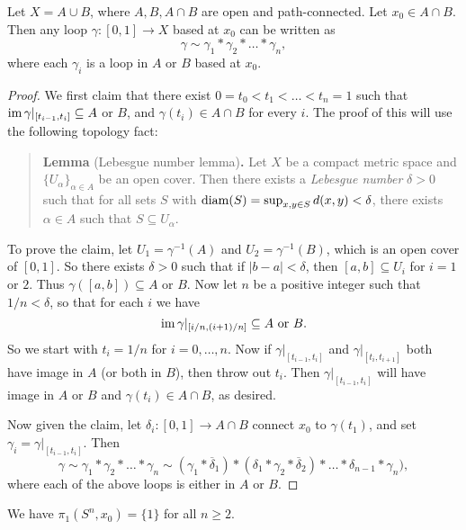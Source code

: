 \begin{lemma}
  Let $X = A \cup B$, where $A, B, A \cap B$
  are open and path-connected. Let $x_0 \in A \cap B$.
  Then any loop $\gamma : [0, 1] \to X$ based at
  $x_0$ can be written as
  \[
    \gamma \sim \gamma_1 * \gamma_2 * \dots * \gamma_n,
  \]
  where each $\gamma_i$ is a loop in $A$ or $B$
  based at $x_0$.
\end{lemma}

\begin{proof}
  We first claim that there exist
  $0 = t_0 < t_1 < \dots < t_n = 1$ such that
  $\operatorname{im} \gamma|_{[t_{i - 1}, t_i]} \subseteq A$
  or $B$, and $\gamma(t_i) \in A \cap B$ for every $i$.
  The proof of this will use the following
  topology fact:
  \begin{quote}
    \textbf{Lemma} (Lebesgue number lemma)\textbf{.}
    Let $X$ be a compact
    metric space and $\{U_\alpha\}_{\alpha \in A}$ be
    an open cover. Then there exists a \emph{Lebesgue number}
    $\delta > 0$ such that for all sets $S$ with
    $\operatorname{diam}(S) = \sup_{x, y \in S} d(x, y) < \delta$,
    there exists $\alpha \in A$ such that $S \subseteq U_\alpha$.
  \end{quote}
  To prove the claim, let $U_1 = \gamma^{-1}(A)$
  and $U_2 = \gamma^{-1}(B)$, which is an open
  cover of $[0, 1]$. So there exists $\delta > 0$
  such that if $|b - a| < \delta$, then
  $[a, b] \subseteq U_i$ for $i = 1$ or $2$. Thus
  $\gamma([a, b]) \subseteq A$ or $B$. Now let
  $n$ be a positive integer such that $1 / n < \delta$,
  so that for each $i$ we have
  \[\operatorname{im} \gamma|_{[i / n, (i + 1) / n]} \subseteq A \text{ or } B.\]
  So we start with $t_i = 1 / n$ for $i = 0, \dots, n$.
  Now if $\gamma|_{[t_{i - 1}, t_i]}$ and
  $\gamma|_{[t_i, t_{i + 1}]}$ both have image in
  $A$ (or both in $B$), then throw out $t_i$. Then
  $\gamma|_{[t_{i - 1}, t_{i}]}$ will have image in
  $A$ or $B$ and $\gamma(t_{i}) \in A \cap B$,
  as desired.

  Now given the claim, let
  $\delta_i : [0, 1] \to A \cap B$ connect
  $x_0$ to $\gamma(t_1)$, and set
  $\gamma_i = \gamma|_{[t_{i - 1}, t_i]}$. Then
  \[
    \gamma \sim \gamma_1 * \gamma_2 * \dots * \gamma_n
    \sim (\gamma_1 * \overline{\delta}_1)
    * (\delta_1 * \gamma_2 * \overline{\delta}_2)
    * \dots
    * \delta_{n - 1} * \gamma_n),
  \]
  where each of the above loops is either in
  $A$ or $B$.
\end{proof}

\begin{theorem}
  We have $\pi_1(S^n, x_0) = \{1\}$ for all $n \ge 2$.
\end{theorem}


